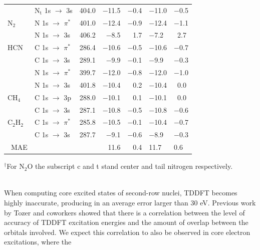\documentclass[12pt]{article}
\begin{document}
\begin{table}[!ht]
\begin{center}
\begin{tabular*}{8cm}{@{\extracolsep{\fill} }llcrrHH}
    ~         & N$_\text{t}$ 1s $\rightarrow$ 3s      & 404.0   & $-$11.5    & $-$0.4   & $-$11.0    & $-$0.5  \\
    N$_2$         &N 1s  $\rightarrow$ $\pi^*$ & 401.0 & $-$12.4 & $-$0.9 & $-$12.4 & $-$1.1 \\
    ~         & N 1s  $\rightarrow$ 3s & 406.2 & $-$8.5 & 1.7  & $-$7.2 & \ 2.7\\ 
    HCN       & C 1s $\rightarrow$ $\pi^*$     & 286.4 & $-$10.6     & $-$0.5  & $-$10.6    & $-$0.7  \\
    ~         & C 1s $\rightarrow$ 3s          & 289.1 & $-$9.9      & $-$0.1   & $-$9.9    & $-$0.3  \\
    ~         & N 1s $\rightarrow$  $\pi^*$    & 399.7 & $-$12.0     & $-$0.8  & $-$12.0    & $-$1.0  \\
    ~         & N 1s $\rightarrow$ 3s          & 401.8 & $-$10.4      & \ 0.2    & $-$10.4    & \ 0.0  \\
    CH$_4$      & C 1s $\rightarrow$ 3p          & 288.0   & $-$10.1      & \ 0.1   & $-$10.1    & \ 0.0   \\
    ~         & C 1s $\rightarrow$ 3s          & 287.1 & $-$10.8    & $-$0.5   & $-$10.8     & $-$0.6 \\ 
        C$_2$H$_2$      & C 1s $\rightarrow$ $\pi^*$           & 285.8   & $-$10.5      & $-$0.1   & $-$10.4   & $-$0.7  \\
    ~         & C 1s $\rightarrow$ 3s            & 287.7 & $-$9.1 & $-$0.6   & $-$8.9    & $-$0.3 \\
    ~MAE         &                            & ~     & 11.6      & 0.4   & 11.7     & 0.6 \\ 
    \hline
    \hline
    \end{tabular*}
\end{center}$^{\dagger}$For N$_2$O the subscript c and t stand center and tail nitrogen respectively.
     \label{table:FirstRow}
     \end{table}
     \\
When computing core excited states of second-row nuclei, TDDFT becomes highly inaccurate, producing in an average error larger than 30 eV. Previous work by Tozer and coworkers \cite{peach_excitation_2008}  showed that there is a correlation between the level of accuracy of TDDFT excitation energies and the amount of overlap between the orbitals involved. We expect this correlation to also be observed in core electron excitations, where the
\end{document}
